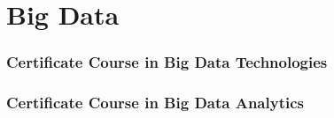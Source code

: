\section{Big Data}
\begin{frame}
	\frametitle{Certificate Course in Big Data Technologies}
\end{frame}

\begin{frame}
	\frametitle{Certificate Course in Big Data Analytics}
\end{frame}